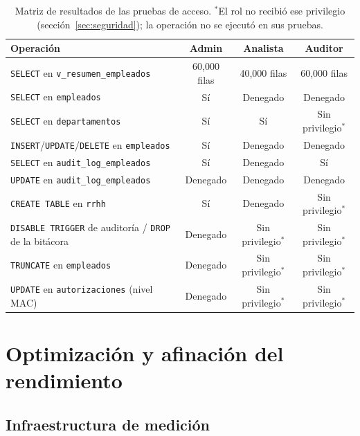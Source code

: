 \documentclass[12pt,a4paper]{article}
\begin{document}
\begin{table}[H]
\centering
\small
\renewcommand{\arraystretch}{1.3}
\begin{tabular}{p{}ccc}
\toprule
\textbf{Operación} & \textbf{Admin} & \textbf{Analista} & \textbf{Auditor} \\
\midrule
\texttt{SELECT} en \texttt{v\_\allowbreak{}resumen\_\allowbreak{}empleados} & 60,000 filas & 40,000 filas & 60,000 filas \\
\texttt{SELECT} en \texttt{empleados} & Sí & Denegado & Denegado \\
\texttt{SELECT} en \texttt{departamentos} & Sí & Sí & Sin privilegio$^{*}$ \\
\texttt{INSERT}/\texttt{UPDATE}/\texttt{DELETE} en \texttt{empleados} & Sí & Denegado & Denegado \\
\texttt{SELECT} en \texttt{audit\_\allowbreak{}log\_\allowbreak{}empleados} & Sí & Denegado & Sí \\
\texttt{UPDATE} en \texttt{audit\_\allowbreak{}log\_\allowbreak{}empleados} & Denegado & Denegado & Denegado \\
\texttt{CREATE TABLE} en \texttt{rrhh} & Sí & Denegado & Sin privilegio$^{*}$ \\
\texttt{DISABLE TRIGGER} de auditoría / \texttt{DROP} de la bitácora & Denegado & Sin privilegio$^{*}$ & Sin privilegio$^{*}$ \\
\texttt{TRUNCATE} en \texttt{empleados} & Denegado & Sin privilegio$^{*}$ & Sin privilegio$^{*}$ \\
\texttt{UPDATE} en \texttt{autorizaciones} (nivel MAC) & Denegado & Sin privilegio$^{*}$ & Sin privilegio$^{*}$ \\
\bottomrule
\end{tabular}
\caption{Matriz de resultados de las pruebas de acceso. $^{*}$El rol no recibió ese privilegio (sección~\ref{sec:seguridad}); la operación no se ejecutó en sus pruebas.}
\label{tab:matriz}
\end{table}

\section{Optimización y afinación del rendimiento}

\subsection{Infraestructura de medición}
\end{document}
